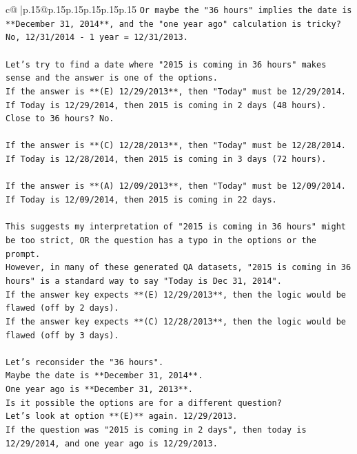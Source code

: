 \documentclass{article}
\begin{document}
{\begin{supertabular}{c@{$\;$}|p{.15\linewidth}@{}p{.15\linewidth}p{.15\linewidth}p{.15\linewidth}p{.15\linewidth}p{.15\linewidth}}
{{{\texttt{Or maybe the "36 hours" implies the date is **December 31, 2014**, and the "one year ago" calculation is tricky?} \\
\texttt{No, 12/31/2014 {-} 1 year = 12/31/2013.} \\
\\ 
\texttt{Let's try to find a date where "2015 is coming in 36 hours" makes sense and the answer is one of the options.} \\
\texttt{If the answer is **(E) 12/29/2013**, then "Today" must be 12/29/2014.} \\
\texttt{If Today is 12/29/2014, then 2015 is coming in 2 days (48 hours). Close to 36 hours? No.} \\
\\ 
\texttt{If the answer is **(C) 12/28/2013**, then "Today" must be 12/28/2014.} \\
\texttt{If Today is 12/28/2014, then 2015 is coming in 3 days (72 hours).} \\
\\ 
\texttt{If the answer is **(A) 12/09/2013**, then "Today" must be 12/09/2014.} \\
\texttt{If Today is 12/09/2014, then 2015 is coming in 22 days.} \\
\\ 
\texttt{This suggests my interpretation of "2015 is coming in 36 hours" might be too strict, OR the question has a typo in the options or the prompt.} \\
\texttt{However, in many of these generated QA datasets, "2015 is coming in 36 hours" is a standard way to say "Today is Dec 31, 2014".} \\
\texttt{If the answer key expects **(E) 12/29/2013**, then the logic would be flawed (off by 2 days).} \\
\texttt{If the answer key expects **(C) 12/28/2013**, then the logic would be flawed (off by 3 days).} \\
\\ 
\texttt{Let's reconsider the "36 hours".} \\
\texttt{Maybe the date is **December 31, 2014**.} \\
\texttt{One year ago is **December 31, 2013**.} \\
\texttt{Is it possible the options are for a different question?} \\
\texttt{Let's look at option **(E)** again. 12/29/2013.} \\
\texttt{If the question was "2015 is coming in 2 days", then today is 12/29/2014, and one year ago is 12/29/2013.} \\
}}}
\end{supertabular}}
\end{document}
